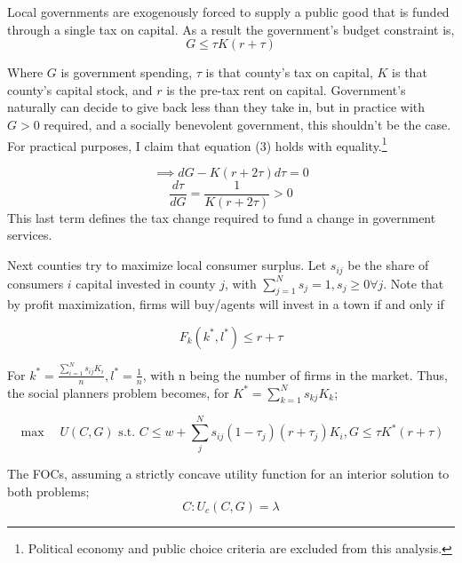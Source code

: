 \documentclass{article}
\begin{document}
Local governments are exogenously forced to supply a public good that is funded through a single tax on capital. As a result the government's budget constraint is,
\begin{equation} G \leq \tau K (r+\tau) \end{equation}

Where $G$ is government spending, $\tau$ is that county's tax on capital, $K$ is that county's capital stock, and $r$ is the pre-tax rent on capital. Government's naturally can decide to give back less than they take in, but in practice with $G > 0$ required, and a socially benevolent government, this shouldn't be the case. For practical purposes, I claim that equation (3) holds with equality.\footnote{Political economy and public choice criteria are excluded from this analysis.}

$$ \implies dG - K(r+2\tau)d\tau= 0$$
\begin{equation} \frac{d\tau}{dG} = \frac{1}{K(r+2\tau)} > 0 \end{equation}
This last term defines the tax change required to fund a change in government services. 

Next counties try to maximize local consumer surplus. Let $s_{ij}$ be the share of consumers $i$ capital invested in county $j$, with $\sum_{j=1}^{N} s_{j} = 1, s_{j} \geq 0 \forall j$. Note that by profit maximization, firms will buy/agents will invest in a town if and only if

$$F_{k}(k^{*},l^{*}) \leq r+\tau$$

For $k^{*} = \frac{\sum_{i=1}^{N}s_{ij}K_{i}}{n}, l^{*} = \frac{1}{n}$, with n being the number of firms in the market. Thus, the social planners problem becomes, for $K^{*} = \sum_{k=1}^{N}s_{kj}K_{k}$;

\begin{equation} \max \quad U(C,G) \text{ s.t. }  C \leq w + \sum_{j}^{N}s_{ij}(1-\tau_{j})(r+\tau_{j})K_{i}, G \leq \tau K^{*}(r+\tau)
\end{equation}

The FOCs, assuming a strictly concave utility function for an interior solution to both problems;
\begin{equation} 
C: U_{c}(C,G) = \lambda
\end{equation}
\end{document}
